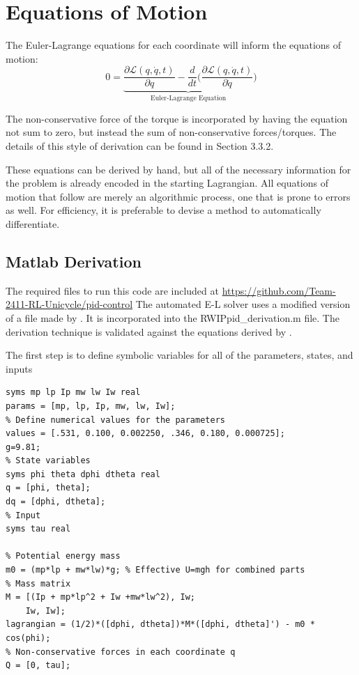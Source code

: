 \documentclass[11pt]{article}
\begin{document}
\section{Equations of Motion}
The Euler-Lagrange equations for each coordinate will inform the equations of motion:
$$0 = \underbrace{\frac{\partial \mathcal{L}(q,\dot{q},t)}{\partial q} - \frac{d}{dt}(\frac{ \partial \mathcal{L}(q,\dot{q},t)}{\partial \dot{q}}}_{\text{Euler-Lagrange Equation}}) $$

The non-conservative force of the torque is incorporated by having the equation not sum to zero, but instead the sum of non-conservative forces/torques. The details of this style of derivation can be found in \cite{Brevik2017} Section 3.3.2.

These equations can be derived by hand, but all of the necessary information for the problem is already encoded in the starting Lagrangian. All equations of motion that follow are merely an algorithmic process, one that is prone to errors as well. For efficiency, it is preferable to devise a method to automatically differentiate.

\subsection{Matlab Derivation}

The required files to run this code are included at \href{https://github.com/Team-2411-RL-Unicycle/pid-control}{https://github.com/Team-2411-RL-Unicycle/pid-control} The automated E-L solver uses a modified version of a file made by \cite{Veng2023EulerLagrangeSolver}. It is incorporated into the RWIPpid\_derivation.m file. The derivation technique is validated against the equations derived by \cite{Brevik2017}.

The first step is to define symbolic variables for all of the parameters, states, and inputs

\begin{lstlisting}[caption={MATLAB Code}, label={lst:matlab_code}]
% Robot variables
syms mp lp Ip mw lw Iw real
params = [mp, lp, Ip, mw, lw, Iw];
% Define numerical values for the parameters
values = [.531, 0.100, 0.002250, .346, 0.180, 0.000725];
g=9.81;
% State variables
syms phi theta dphi dtheta real
q = [phi, theta];
dq = [dphi, dtheta];
% Input
syms tau real

% Potential energy mass
m0 = (mp*lp + mw*lw)*g; % Effective U=mgh for combined parts
% Mass matrix
M = [(Ip + mp*lp^2 + Iw +mw*lw^2), Iw;
    Iw, Iw];
lagrangian = (1/2)*([dphi, dtheta])*M*([dphi, dtheta]') - m0 * cos(phi);
% Non-conservative forces in each coordinate q
Q = [0, tau];
\end{lstlisting}
\end{document}
